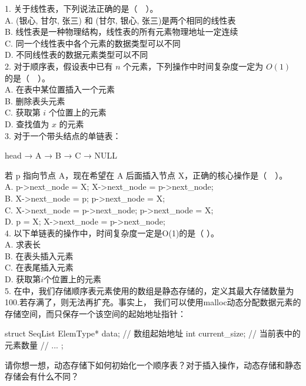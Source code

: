 \begin{exercise}
1. 关于线性表，下列说法正确的是（　）。\\
A. (银心, 甘尔, 张三) 和 (甘尔, 银心, 张三)是两个相同的线性表 \\
B. 线性表是一种物理结构，线性表的所有元素物理地址一定连续\\
C. 同一个线性表中各个元素的数据类型可以不同\\
D. 不同线性表的数据元素类型可以不同\\

2. 对于顺序表，假设表中已有 \(n\) 个元素，下列操作中时间复杂度一定为 \(O(1)\) 的是（　）。\\
A. 在表中某位置插入一个元素\\
B. 删除表头元素\\
C. 获取第 \(i\) 个位置上的元素\\
D. 查找值为 \(x\) 的元素\\

3. 对于一个带头结点的单链表：
\begin{bulk}
head → A → B → C → NULL
\end{bulk}
若 p 指向节点 A，现在希望在 A 后面插入节点 X，正确的核心操作是（　）。\\
A. p->next\_node = X;
X->next\_node = p->next\_node;\\
B. X->next\_node = p;
p->next\_node = X;\\
C. X->next\_node = p->next\_node;
p->next\_node = X;\\
D. p = X;
X->next\_node = p->next\_node;\\

4. 以下单链表的操作中，时间复杂度一定是O(1)的是（  ）。\\
A. 求表长\\
B. 在表头插入元素\\
C. 在表尾插入元素\\
D. 获取第\(i\)个位置上的元素\\

5. 在中，我们存储顺序表元素使用的数组是静态存储的，定义其最大存储数量为100.若存满了，则无法再扩充。事实上，
我们可以使用malloc动态分配数据元素的存储空间，而只保存一个该空间的起始地址指针：
\begin{cppcode}
    struct SeqList{  
        ElemType* data;         // 数组起始地址
        int current_size;       // 当前表中的元素数量
        // ...
    };
\end{cppcode}
请你想一想，动态存储下如何初始化一个顺序表？对于插入操作，动态存储和静态存储会有什么不同？\\


\end{exercise}
